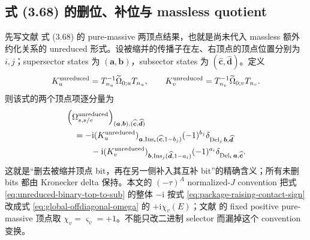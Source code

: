 \documentclass[11pt,a4paper]{ctexart}
\newcommand{\ii}{\mathrm i}
\newcommand{\unred}{{\rm unreduced}}
\begin{document}
\subsection{\texorpdfstring{\cite{Chen:2023eic}}{arXiv:2401.00129} 式 (3.68) 的删位、补位与 massless quotient}

先写文献 \cite{Chen:2023eic} 式 (3.68) 的 pure-massive 两顶点结果，也就是尚未代入 massless 额外约化关系的 unreduced 形式。设被缩并的传播子在左、右顶点的顶点位置分别为 $i,j$；supersector states 为 $(\bm a,\bm b)$，subsector states 为 $(\widehat{\bm c},\widehat{\bm d})$。定义
\begin{equation}
 K_u^{\unred}=T_{n_u}^{-1}\widetilde\Omega_{0;u}T_{n_u},
 \qquad
 K_v^{\unred}=T_{n_v}^{-1}\widetilde\Omega_{0;v}T_{n_v}.
 \label{eq:component-log-kernel}
\end{equation}
则该式的两个顶点项逐分量为
\begin{align}
 &\left(\Omega_{s,s/e}^{\unred}\right)_{(\bm a,\bm b),(\widehat{\bm c},\widehat{\bm d})}
 \notag\\
 &\quad=-\ii
 (K_u^{\unred})_{\bm a,\operatorname{Ins}_i(\widehat{\bm c},1-b_j)}
 (-1)^{b_j}
 \delta_{\operatorname{Del}_j\bm b,\widehat{\bm d}}
 \notag\\
 &\qquad\quad-\ii
 (K_v^{\unred})_{\bm b,\operatorname{Ins}_j(\widehat{\bm d},1-a_i)}
 (-1)^{a_i}
 \delta_{\operatorname{Del}_i\bm a,\widehat{\bm c}}.
 \label{eq:unreduced-binary-top-to-sub}
\end{align}
这就是“删去被缩并顶点 bit，再在另一侧补入其互补 bit”的精确含义；所有未删 bits 都由 Kronecker delta 保持。本文的 $(-\tau)^A$ normalized-$J$ convention 把式 \eqref{eq:unreduced-binary-top-to-sub} 的整体 $-\ii$ 按式 \eqref{eq:package-raising-contact-sign} 改成式 \eqref{eq:global-offdiagonal-omega} 的 $+\ii\chi_v(E)$；文献 \cite{Chen:2023eic} 的 fixed positive pure-massive 顶点取 $\chi_v=\varsigma_v=+1$。不能只改二进制 selector 而漏掉这个 convention 变换。
\end{document}
